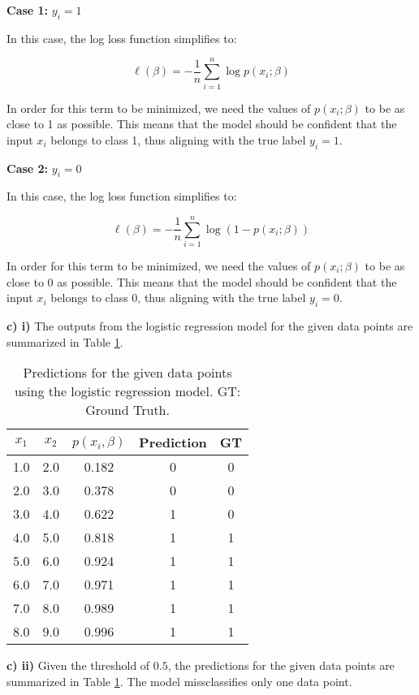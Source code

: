 \documentclass{article}
\begin{document}
\textbf{Case 1:} $y_i = 1$

In this case, the log loss function simplifies to:

\begin{equation}
  \ell(\beta) = -\frac{1}{n} \sum_{i=1}^{n} \log p(x_i; \beta)
\end{equation}

In order for this term to be minimized, we need the values of $p(x_i; \beta)$ to be as close to 1 as possible. This means that the model should be confident that the input $x_i$ belongs to class 1, thus aligning with the true label $y_i = 1$.


\textbf{Case 2:} $y_i = 0$

In this case, the log loss function simplifies to:

\begin{equation}
  \ell(\beta) = -\frac{1}{n} \sum_{i=1}^{n} \log \left(1 - p(x_i; \beta) \right)
\end{equation}

In order for this term to be minimized, we need the values of $p(x_i; \beta)$ to be as close to 0 as possible. This means that the model should be confident that the input $x_i$ belongs to class 0, thus aligning with the true label $y_i = 0$.


\textbf{c) i)} The outputs from the logistic regression model for the given data points are summarized in Table \ref{tab:x1_x2_pred_data}.

\begin{table}[h!]
  \centering
  \caption{
    Predictions for the given data points using the logistic regression model. GT: Ground Truth.
  }
  \begin{tabular}{ccccc}
    \toprule
    \textbf{$x_1$} & \textbf{$x_2$} & \textbf{$p(x_i, \beta)$} & \textbf{Prediction} & \textbf{GT}\\
    \midrule
    1.0 & 2.0 & 0.182 & 0 & 0\\
    2.0 & 3.0 & 0.378 & 0 & 0\\
    3.0 & 4.0 & 0.622 & 1 & 0\\
    4.0 & 5.0 & 0.818 & 1 & 1\\
    5.0 & 6.0 & 0.924 & 1 & 1\\
    6.0 & 7.0 & 0.971 & 1 & 1\\
    7.0 & 8.0 & 0.989 & 1 & 1\\
    8.0 & 9.0 & 0.996 & 1 & 1\\
    \bottomrule
  \end{tabular}
  \label{tab:x1_x2_pred_data}
\end{table}

\textbf{c) ii)} Given the threshold of $0.5$, the predictions for the given data points are summarized in Table \ref{tab:x1_x2_pred_data}. The model missclassifies only one data point.

\clearpage
 
% 
% 

\end{document}

